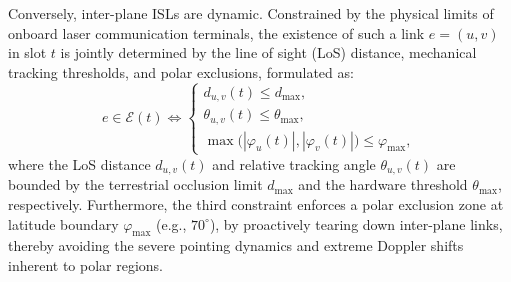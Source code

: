 \documentclass[10pt, conference, letterpaper]{IEEEtran}
\begin{document}
Conversely, inter-plane ISLs are dynamic.
Constrained by the physical limits of onboard laser communication terminals, the existence of such a link $e=(u,v)$ in slot $t$ is jointly determined by the line of sight (LoS) distance, mechanical tracking thresholds, and polar exclusions, formulated as:
\begin{equation}
e\in \mathcal{E}(t) \iff \left\{
\begin{array}{l}
d_{u,v}(t) \le d_{\text{max}}, \\
\theta_{u,v}(t) \le \theta_{\text{max}}, \\
\max\big(|\varphi_u(t)|, |\varphi_v(t)|\big) \le \varphi_{\text{max}},
\end{array}
\right.
\label{eq:cross_link_indicator}
\end{equation}
where the LoS distance $d_{u,v}(t)$ and relative tracking angle $\theta_{u,v}(t)$ are bounded by the terrestrial occlusion limit $d_{\text{max}}$ and the hardware threshold $\theta_{\text{max}}$, respectively.
Furthermore, the third constraint enforces a polar exclusion zone at latitude boundary $\varphi_{\text{max}}$ (e.g., $70^{\circ}$), by proactively tearing down inter-plane links, thereby avoiding the severe pointing dynamics and extreme Doppler shifts inherent to polar regions.
\end{document}
